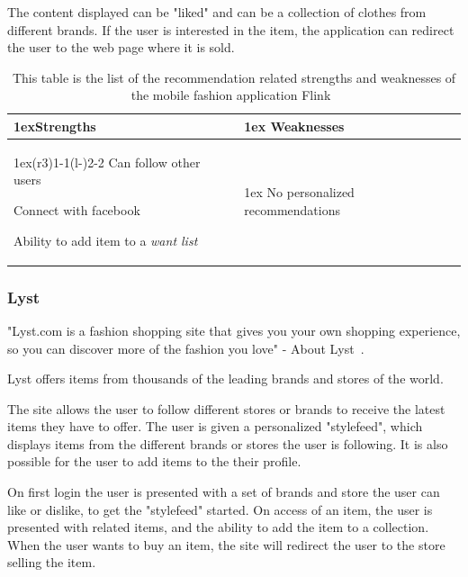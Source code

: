     The content displayed can be "liked" and can be a collection of clothes from different brands.
    If the user is interested in the item, the application can redirect the user to the web page where it is sold.
    \begin{table}[H]
            \centering
            \begin{tabularx}{\linewidth}{>{\parskip1ex}X@{\kern4\tabcolsep}>{\parskip1ex}X}
                \toprule
                \hfil\bfseries Strengths
                &
                \hfil\bfseries Weaknesses
                \\\cmidrule(r{3\tabcolsep}){1-1}\cmidrule(l{-\tabcolsep}){2-2}
                Can follow other users \par
                Connect with facebook \par
                Ability to add item to a \emph{want list} \par
                &
                No personalized recommendations \par
                \\\bottomrule
                \end{tabularx}
        \caption[Recommendation related strengths and weaknesses of Flink~\cite{flink}]{This table is the list of the recommendation related strengths and weaknesses of the mobile fashion application Flink~\cite{flink}}
        \label{table:iphoneAppFlink}
    \end{table}

\subsubsection{Lyst} %
\label{par:lyst}
    "Lyst.com is a fashion shopping site that gives you your own shopping experience, so you can discover more of the fashion you love" - About Lyst~\cite{lyst}.

    Lyst offers items from thousands of the leading brands and stores of the world.

    The site allows the user to follow different stores or brands to receive the latest items they have to offer.
    The user is given a personalized "stylefeed", which displays items from the different brands or stores the user is following.
    It is also possible for the user to add items to the their profile.

    On first login the user is presented with a set of brands and store the user can like or dislike, to get the "stylefeed" started.
    On access of an item, the user is presented with related items, and the ability to add the item to a collection.
    When the user wants to buy an item, the site will redirect the user to the store selling the item.

